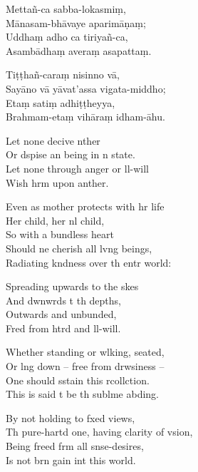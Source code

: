 Mettañ-ca sabba-lokasmiṃ,\\
Mānasam-bhāvaye aparimāṇaṃ;\\
Uddhaṃ adho ca tiriyañ-ca,\\
Asambādhaṃ averaṃ asapattaṃ.

Tiṭṭhañ-caraṃ nisinno vā,\\
Sayāno vā yāvat'assa vigata-middho;\\
Etaṃ satiṃ adhiṭṭheyya,\\
Brahmam-etaṃ vihāraṃ idham-āhu.


\clearpage

Let none decive nther\\%
Or dspise an being in n state.\\
Let none through anger or ll-will\\
Wish hrm upon anther.

Even as  mother protects with hr life\\
Her child, her nl child,\\
So with a bundless heart\\
Should ne cherish all lvng beings,\\
Radiating kndness over th entr world:

Spreading upwards to the skes\\
And dwnwrds t th depths,\\
Outwards and unbunded,\\
Fred from htrd and ll-will.

Whether standing or wlking, seated, \\
Or lng down -- free from drwsiness --\\
One should sstain this rcollction.\\
This is said t be th sublme abding.

By not holding to fxed views,\\
Th pure-hartd one, having clarity of vsion,\\
Being freed frm all snse-desires,\\
Is not brn gain int this world.

\clearpage

